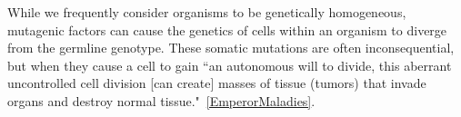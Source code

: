 \documentclass[../../main.tex]{subfiles}
\begin{document}
While we frequently consider organisms to be genetically homogeneous, mutagenic factors can cause the genetics of cells within an organism to diverge from the germline genotype. These somatic mutations are often inconsequential, but when they cause a cell to gain ``an autonomous will to divide, this aberrant uncontrolled cell division [can create] masses of tissue (tumors) that invade organs and destroy normal tissue."~\ref{EmperorMaladies}. 



\end{document}
